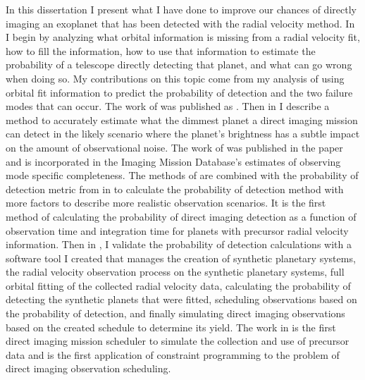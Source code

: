 In this dissertation I present what I have done to improve our chances of
directly imaging an exoplanet that has been detected with the radial velocity
method. In  I begin by analyzing what orbital information
is missing from a radial velocity fit, how to fill the information, how to use
that information to estimate the probability of a telescope directly detecting
that planet, and what can go wrong when doing so. My contributions on this
topic come from my analysis of using orbital fit information to predict the
probability of detection and the two failure modes that can occur. The work of
 was published as \citet{spohnSchedulingDirect2022}. Then
in  I describe a method to accurately estimate what the
dimmest planet a direct imaging mission can detect in the likely scenario where
the planet's brightness has a subtle impact on the amount of observational
noise. The work of  was published in the paper
\citet{spohnDirectImaging2022} and is incorporated in the Imaging Mission
Database's \citep{savranskyExplorationDynamical2019} estimates of observing
mode specific completeness. The methods of  are combined
with the probability of detection metric from  in
 to calculate the probability of detection method with
more factors to describe more realistic observation scenarios. It is the first
method of calculating the probability of direct imaging detection as a function
of observation time and integration time for planets with precursor radial
velocity information. Then in , I validate the
probability of detection calculations with a software tool I created that
manages the creation of synthetic planetary systems, the radial velocity
observation process on the synthetic planetary systems, full orbital fitting of
the collected radial velocity data, calculating the probability of detecting
the synthetic planets that were fitted, scheduling observations based on the
probability of detection, and finally simulating direct imaging observations
based on the created schedule to determine its yield. The work in
 is the first direct imaging mission scheduler to
simulate the collection and use of precursor data and is the first application
of constraint programming to the problem of direct imaging observation
scheduling.
